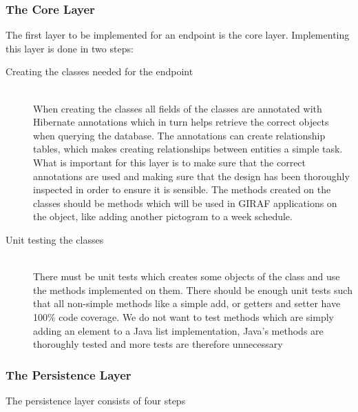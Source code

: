 \subsubsection{The Core Layer}
The first layer to be implemented for an endpoint is the core layer.
Implementing this layer is done in two steps:
\begin{description}
	\item[Creating the classes needed for the endpoint] \hfill \\
	When creating the classes all fields of the classes are annotated with Hibernate annotations which in turn helps retrieve the correct objects when querying the database.
	The annotations can create relationship tables, which makes creating relationships between entities a simple task.
	What is important for this layer is to make sure that the correct annotations are used and making sure that the design has been thoroughly inspected in order to ensure it is sensible.
	The methods created on the classes should be methods which will be used in GIRAF applications on the object, like adding another pictogram to a week schedule.
	\item[Unit testing the classes] \hfill \\
	There must be unit tests which creates some objects of the class and use the methods implemented on them.
	There should be enough unit tests such that all non-simple methods like a simple add, or getters and setter have 100\% code coverage.
	We do not want to test methods which are simply adding an element to a Java list implementation, Java's methods are thoroughly tested and more tests are therefore unnecessary 
\end{description}

\noindent
\subsubsection{The Persistence Layer}
The persistence layer consists of four steps

